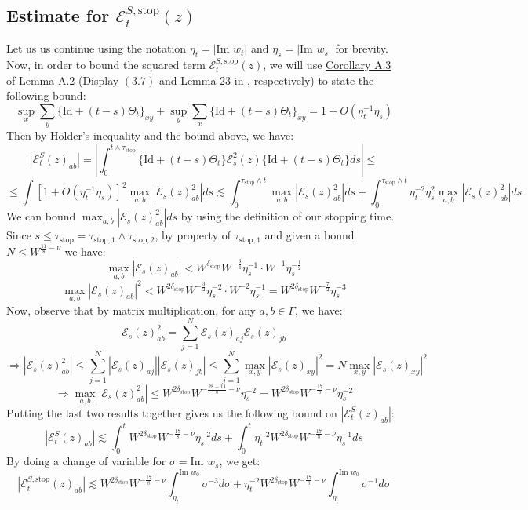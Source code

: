 \documentclass[11pt]{article}
\newcommand{\E}{\mathcal{E}}
\newcommand{\sto}{\text{stop}}
\newcommand{\im}{\text{Im }}
\begin{document}
\subsection{Estimate for $\E_t^{S, \text{stop}}(z)$}

Let us us continue using the notation $\eta_t = |\im w_t|$ and $\eta_s=|\im w_s|$ for brevity. Now, in order to bound the squared term $\E_t^{S, \sto}(z)$, we will use \hyperref[cor-a3]{Corollary A.3} of \hyperref[lemma-a2]{Lemma A.2} (Display $(3.7)$ and Lemma 23 in \cite{bandSDE}, respectively) to state the following  bound: $$\sup_x \sum_y \{\text{Id}+(t-s)\Theta_t\}_{xy}+\sup_y \sum_x \{\text{Id}+(t-s)\Theta_t\}_{xy} = 1+O(\eta_t^{-1}\eta_s)$$
Then by Hölder's inequality and the bound above, we have: $$|\E_t^{S}(z)_{ab}|=\left\vert\int_0^{t\wedge \tau_\sto} \{\text{Id} + (t-s)\Theta_t\}\E_s^2(z) \{\text{Id} + (t-s)\Theta_t\}ds\right\vert \leq$$
$$\leq \int \left[1+O(\eta_t^{-1}\eta_s)\right]^2 \max_{a, b}|\E_s(z)_{ab}^2|ds \lesssim \int_0^{\tau_\sto \wedge t} \max_{a, b}|\E_s(z)_{ab}^2|ds + \int_0^{\tau_\sto \wedge t}\eta_t^{-2}\eta_s^{2} \max_{a, b}|\E_s(z)^2_{ab}|ds$$
We can bound $\max_{a, b}|\E_s(z)_{ab}^2|ds$ by using the definition of our stopping time. Since $s\leq \tau_\sto = \tau_{\sto, 1}\wedge \tau_{\sto, 2}$, by property of $\tau_{\sto, 1}$ and given a bound $N\leq W^{\frac{11}{8}-\nu}$ we have: $$\max_{a, b}|\E_s(z)_{ab}|<W^{\delta_\sto} W^{-\frac{3}{4}} \eta_s^{-1}\cdot W^{-1}\eta_s^{-\frac{1}{2}}$$
$$\max_{a, b}|\E_s(z)_{ab}|^2<W^{2\delta_\sto} W^{-\frac{3}{2}} \eta_s^{-2}\cdot W^{-2}\eta_s^{-1}=W^{2\delta_{\sto}} W^{-\frac{7}{2}}\eta_s^{-3} $$
Now, observe that by matrix multiplication, for any $a, b\in \Gamma$, we have: $$\E_s(z)^2_{ab} = \sum_{j=1}^N \E_s(z)_{aj}\E_s(z)_{jb}$$
$$\Rightarrow |\E_s(z)_{ab}^2|\leq \sum_{j=1}^N |\E_s(z)_{aj}||\E_s(z)_{jb}|\leq \sum_{j=1}^N \max_{x,y}|\E_s(z)_{xy}|^2 = N\max_{x,y}|\E_s(z)_{xy}|^2$$
$$\Rightarrow \max_{a,b}|\E_s(z)^2_{ab}|\leq W^{2\delta_\sto}W^{-\frac{28-11}{8}-\nu}\eta_s^{-2} = W^{2\delta_\sto}W^{-\frac{17}{8}-\nu}\eta_s^{-2}$$
Putting the last two results together gives us the following bound on $|\E_t^S(z)_{ab}|$:
$$|\E_t^S(z)_{ab}|\lesssim \int_0^t W^{2\delta_\sto}W^{-\frac{17}{8}-\nu}\eta_s^{-2}ds + \int_0^t \eta_t^{-2}W^{2\delta_\sto}W^{-\frac{17}{8}-\nu}\eta_s^{-1}ds$$
By doing a change of variable for $\sigma = \im w_s$, we get: 
\begin{equation*}
|\E_t^{S, \sto}(z)_{ab}|\lesssim W^{2\delta_\sto} W^{-\frac{17}{8}-\nu}\int_{\eta_t}^{\im w_0}\sigma^{-3}d\sigma + \eta_t^{-2} W^{2\delta_\sto} W^{-\frac{17}{8}-\nu}\int_{\eta_t}^{\im w_0}\sigma^{-1}d\sigma
\end{equation*}
\end{document}
